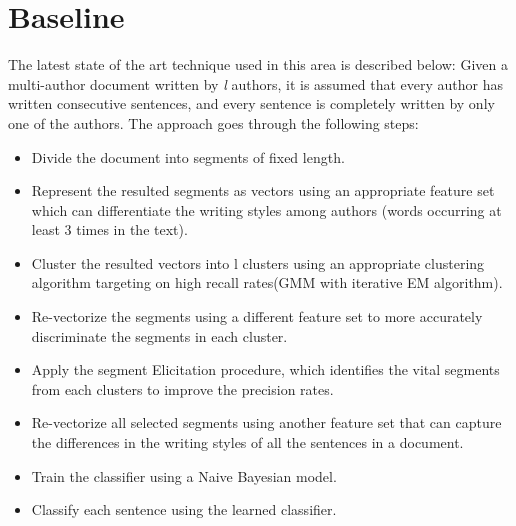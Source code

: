 \documentclass[letterpaper]{article}
\begin{document}

\section{Baseline}
The latest state of the art technique used in this area is described below:
Given a multi-author document written by \textit{l} authors, it is assumed that every author has written consecutive sentences, and every sentence is completely written by only one of the authors. The approach goes through the following steps:
\begin{itemize}
\item Divide the document into segments of fixed length.
\item Represent the resulted segments as vectors using an appropriate feature set which can differentiate the writing styles among authors (words occurring at least 3 times in the text).
\item Cluster the resulted vectors into l clusters using an appropriate clustering algorithm targeting on high recall rates(GMM with iterative EM algorithm).
\item Re-vectorize the segments using a different feature set to more accurately discriminate the segments in each cluster.
\item Apply the segment Elicitation procedure, which identifies the vital segments from each clusters to improve the precision rates.
\item Re-vectorize all selected segments using another feature set that can capture the differences in the writing styles of all the sentences in a document.
\item Train the classifier using a Naive Bayesian model.
\item Classify each sentence using the learned classifier.
\end{itemize}
\end{document}
